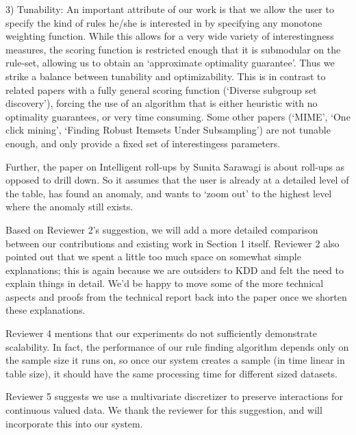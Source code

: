 \documentclass{article}
\begin{document}
3) Tunability: An important attribute of our work is that we allow the user to specify the kind of rules he/she is interested in by specifying any monotone weighting function. While this allows for a very wide variety of interestingness measures, the scoring function is restricted enough that it is submodular on the rule-set, allowing us to obtain an `approximate optimality guarantee'. Thus we strike a balance between tunability and optimizability. This is in contrast to related papers with a fully general scoring function (`Diverse subgroup set discovery'), forcing the use of an algorithm that is either heuristic with no optimality guarantees, or very time consuming. Some other papers (`MIME', `One click mining', `Finding Robust Itemsets Under Subsampling') are not tunable enough, and only provide a fixed set of interestingess parameters. 


Further, the paper on Intelligent roll-ups by Sunita Sarawagi is about roll-ups as opposed to drill down. So it assumes that the user is already at a detailed level of the table, has found an anomaly, and wants to `zoom out' to the highest level where the anomaly still exists.

Based on Reviewer 2's suggestion, we will add a more detailed comparison between our contributions and existing work in Section 1 itself. Reviewer 2 also pointed out that we spent a little too much space on somewhat simple explanations;
this is again because we are outsiders to KDD and felt the need to explain things in detail. We'd be happy to move some of the more technical aspects and proofs from the technical report back into the paper once we shorten these explanations.

Reviewer 4 mentions that our experiments do not sufficiently demonstrate scalability. In fact, the performance of our rule finding algorithm depends only on the sample size it runs on, so once our system creates a sample (in time linear in table size), it should have the same processing time for different sized datasets. 

Reviewer 5 suggests we use a multivariate discretizer to preserve interactions for continuous valued data. We thank the reviewer for this suggestion, and will incorporate this into our system.
\end{document}
